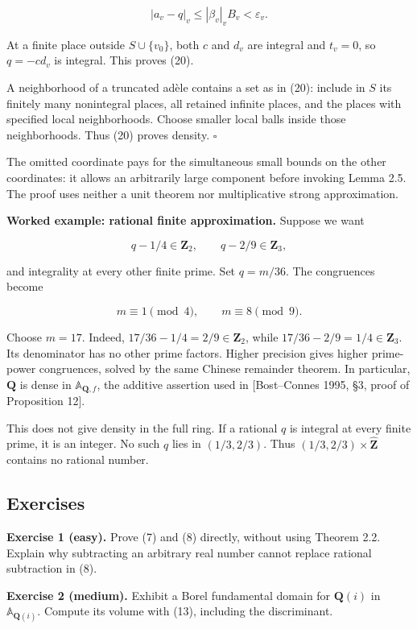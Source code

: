 \documentclass[
  english,
  11pt,
  a4paper,
]{article}
\begin{document}
\[|a_v-q|_v\leq|\beta_v|_v B_v<\varepsilon_v.\]

At a finite place outside \(S\cup\{v_0\}\), both \(c\) and \(d_v\) are
integral and \(t_v=0\), so \(q=-cd_v\) is integral. This proves (20).

A neighborhood of a truncated adèle contains a set as in (20): include
in \(S\) its finitely many nonintegral places, all retained infinite
places, and the places with specified local neighborhoods. Choose
smaller local balls inside those neighborhoods. Thus (20) proves
density. \(\square\)

The omitted coordinate pays for the simultaneous small bounds on the
other coordinates: it allows an arbitrarily large component before
invoking Lemma 2.5. The proof uses neither a unit theorem nor
multiplicative strong approximation.

\textbf{Worked example: rational finite approximation.} Suppose we want

\[q-1/4\in\mathbf Z_2,\qquad q-2/9\in\mathbf Z_3,\]

and integrality at every other finite prime. Set \(q=m/36\). The
congruences become

\[m\equiv1\pmod4,\qquad m\equiv8\pmod9.\]

Choose \(m=17\). Indeed, \(17/36-1/4=2/9\in\mathbf Z_2\), while
\(17/36-2/9=1/4\in\mathbf Z_3\). Its denominator has no other prime
factors. Higher precision gives higher prime-power congruences, solved
by the same Chinese remainder theorem. In particular, \(\mathbf Q\) is
dense in \(\mathbb A_{\mathbf Q,f}\), the additive assertion used in
{[}Bost--Connes 1995, §3, proof of Proposition 12{]}.

This does not give density in the full ring. If a rational \(q\) is
integral at every finite prime, it is an integer. No such \(q\) lies in
\((1/3,2/3)\). Thus \((1/3,2/3)\times\widehat{\mathbf Z}\) contains no
rational number.

\subsection{Exercises}\label{NT-ADL-02--exercises}

\textbf{Exercise 1 (easy).} Prove (7) and (8) directly, without using
Theorem 2.2. Explain why subtracting an arbitrary real number cannot
replace rational subtraction in (8).

\textbf{Exercise 2 (medium).} Exhibit a Borel fundamental domain for
\(\mathbf Q(i)\) in \(\mathbb A_{\mathbf Q(i)}\). Compute its volume
with (13), including the discriminant.
\end{document}
